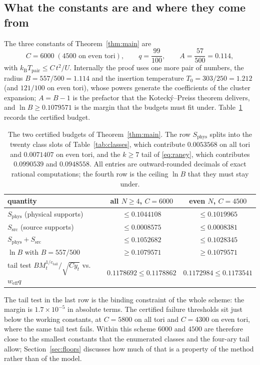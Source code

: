 \documentclass[11pt]{article}
\theoremstyle{plain}
\theoremstyle{definition}
\begin{document}
\subsection{What the constants are and where they come from}\label{sec:constants}

The three constants of Theorem~\ref{thm:main} are
\begin{equation}\label{eq:constants}
C=6000 \;(4500 \text{ on even tori}),\qquad q=\frac{99}{100},\qquad
A=\frac{57}{500}=0.114,
\end{equation}
with $k_{\mathrm{B}}T_{\mathrm{pair}}\le C\,t^{2}/U$. Internally the proof uses one
more pair of numbers, the radius $B=557/500=1.114$ and the insertion temperature
$T_0=303/250=1.212$ (and $121/100$ on even tori), whose powers generate the
coefficients of the cluster expansion; $A=B-1$ is the prefactor that the
Koteck\'y--Preiss theorem delivers, and $\ln B\ge0.1079571$ is the margin that the
budgets must fit under. Table~\ref{tab:audit} records the certified budget.

\begin{table}[t]
\centering
\small
\caption{The two certified budgets of Theorem~\ref{thm:main}. The row
$S_{\mathrm{phys}}$ splits into the twenty class slots of Table~\ref{tab:classes},
which contribute $0.0053568$ on all tori and $0.0071407$ on even tori, and the
$k\ge7$ tail of \eqref{eq:raney}, which contributes $0.0990539$ and $0.0948558$. All
entries are outward-rounded decimals of exact rational computations; the fourth row
is the ceiling $\ln B$ that they must stay under.}
\label{tab:audit}
\begin{tabular}{lcc}
\hline
quantity & all $N\ge4$, $C=6000$ & even $N$, $C=4500$\\
\hline
$S_{\mathrm{phys}}$ (physical supports) & $\le0.1044108$ & $\le0.1019965$\\
$S_{\mathrm{src}}$ (source supports) & $\le0.0008575$ & $\le0.0008381$\\
$S_{\mathrm{phys}}+S_{\mathrm{src}}$ & $\le0.1052682$ & $\le0.1028345$\\
$\ln B$ with $B=557/500$ & $\ge0.1079571$ & $\ge0.1079571$\\
tail test $B M_t^{1/c_{\mathrm{tail}}}/\sqrt{Cy_t}$ vs.\ $w_{\mathrm{eff}}q$
& $0.1178692\le0.1178862$ & $0.1172984\le0.1173541$\\
\hline
\end{tabular}
\end{table}

The tail test in the last row is the binding constraint of the whole scheme: the
margin is $1.7\times10^{-5}$ in absolute terms. The certified failure thresholds sit
just below the working constants, at $C=5800$ on all tori and $C=4300$ on even tori,
where the same tail test fails. Within this scheme $6000$ and $4500$ are therefore
close to the smallest constants that the enumerated classes and the four-ary tail
allow; Section~\ref{sec:floors} discusses how much of that is a property of the
method rather than of the model.
\end{document}
